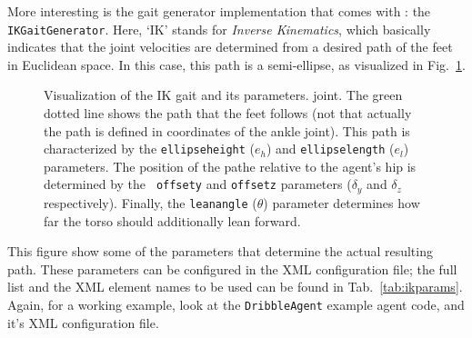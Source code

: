 More interesting is the gait generator implementation that comes with
\libbats: the {\tt IKGaitGenerator}. Here, `IK' stands for
\emph{Inverse Kinematics}, which basically indicates that the joint
velocities are determined from a desired path of the feet in Euclidean
space. In this case, this path is a semi-ellipse, as visualized in
Fig.~\ref{fig:gait}.

\begin{figure}
  \centering
  \caption{Visualization of the IK gait and its parameters.
    joint. The green dotted line shows the path that the feet follows
    (not that actually the path is defined in coordinates of the ankle
    joint). This path is characterized by the {\tt ellipseheight}
    ($e_h$) and {\tt ellipselength} ($e_l$) parameters. The position
    of the pathe relative to the agent's hip is determined by the {\tt
      offsety} and {\tt offsetz} parameters ($\delta_y$ and $\delta_z$
    respectively). Finally, the {\tt leanangle} ($\theta$) parameter
    determines how far the torso should additionally lean
    forward. \label{fig:gait}}
\end{figure}

This figure show some of the parameters that determine the actual
resulting path. These parameters can be configured in the XML
configuration file; the full list and the XML element names to be used
can be found in Tab.~\ref{tab:ikparams}. Again, for a working example,
look at the {\tt DribbleAgent} example agent code, and it's XML
configuration file.

